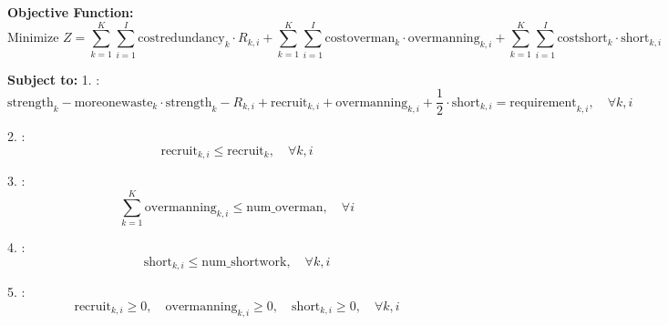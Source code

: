 \documentclass{article}
\begin{document}
\textbf{Objective Function:}
\[
\text{Minimize } Z = \sum_{k=1}^{K} \sum_{i=1}^{I} \text{costredundancy}_{k} \cdot R_{k, i} + \sum_{k=1}^{K} \sum_{i=1}^{I} \text{costoverman}_{k} \cdot \text{overmanning}_{k, i} + \sum_{k=1}^{K} \sum_{i=1}^{I} \text{costshort}_{k} \cdot \text{short}_{k, i}
\]

\textbf{Subject to:}
1. :
\[
\text{strength}_{k} - \text{moreonewaste}_{k} \cdot \text{strength}_{k} - R_{k, i} + \text{recruit}_{k, i} + \text{overmanning}_{k, i} + \frac{1}{2} \cdot \text{short}_{k, i} = \text{requirement}_{k, i}, \quad \forall k, i
\]

2. :
\[
\text{recruit}_{k, i} \leq \text{recruit}_{k}, \quad \forall k, i
\]

3. :
\[
\sum_{k=1}^{K} \text{overmanning}_{k, i} \leq \text{num\_overman}, \quad \forall i
\]

4. :
\[
\text{short}_{k, i} \leq \text{num\_shortwork}, \quad \forall k, i
\]

5. :
\[
\text{recruit}_{k, i} \geq 0, \quad \text{overmanning}_{k, i} \geq 0, \quad \text{short}_{k, i} \geq 0, \quad \forall k, i
\]
\end{document}
